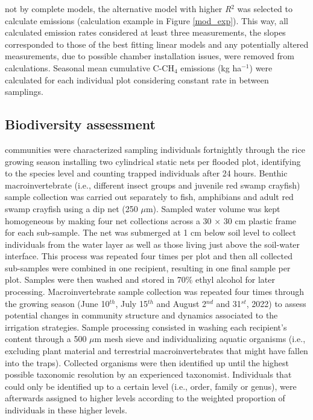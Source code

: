 not by complete models, the alternative model with higher \textit{R}$^2$ was selected to calculate emissions (calculation example in Figure \ref{mod_exp}). This way, all calculated emission rates considered at least three measurements, the slopes corresponded to those of the best fitting linear models and any potentially altered measurements, due to possible chamber installation issues, were removed from calculations. Seasonal mean cumulative C-CH$_{4}$ emissions (kg ha$^{-1}$) were calculated for each individual plot considering constant rate in between samplings. \\

\subsection{Biodiversity assessment}
\label{sec:meth_BIO}

 communities  were characterized sampling individuals fortnightly through the rice growing season installing two cylindrical static nets per flooded plot, identifying to the species level and counting trapped individuals after 24 hours. Benthic macroinvertebrate (i.e., different insect groups and juvenile red swamp crayfish) sample collection was carried out separately to fish, amphibians and adult red swamp crayfish using a dip net (250 $\mu$m). Sampled water volume was kept homogeneous by making four net collections across a 30 $\times$ 30 cm plastic frame for each sub-sample. The net was submerged at 1 cm below soil level to collect individuals from the water layer as well as those living just above the soil-water interface. This process was repeated four times per plot and then all collected sub-samples were combined in one recipient, resulting in one final sample per plot. Samples were then washed and stored in 70$\%$ ethyl alcohol for later processing. Macroinvertebrate sample collection was repeated four times through the growing season (June 10$^{th}$, July 15$^{th}$ and August 2$^{nd}$ and 31$^{st}$, 2022) to assess potential changes in community structure and dynamics associated to the irrigation strategies. Sample processing consisted in washing each recipient's content through a 500 $\mu$m mesh sieve and individualizing aquatic organisms (i.e., excluding plant material and terrestrial macroinvertebrates that might have fallen into the traps). Collected organisms were then identified up until the highest possible taxonomic resolution by an experienced taxonomist. Individuals that could only be identified up to a certain level (i.e., order, family or genus), were afterwards assigned to higher levels according to the weighted proportion of individuals in these higher levels.

